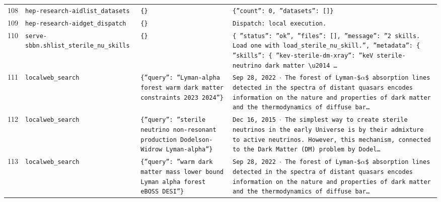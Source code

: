 \documentclass[11pt,a4paper]{article}
\begin{document}
\begin{longtable}{@{}p{}p{}p{}p{}@{}}
108 & \texttt{hep-research-aid}\newline\texttt{list\_\allowbreak{}datasets} & \texttt{\{\}\allowbreak{}} & \texttt{\{''count'':\allowbreak{} 0,\allowbreak{} ''datasets'':\allowbreak{} []\allowbreak{}\}\allowbreak{}} \\
109 & \texttt{hep-research-aid}\newline\texttt{get\_\allowbreak{}dispatch} & \texttt{\{\}\allowbreak{}} & \texttt{Dispatch:\allowbreak{} local execution.} \\
110 & \texttt{serve-sbbn.sh}\newline\texttt{list\_\allowbreak{}sterile\_\allowbreak{}nu\_\allowbreak{}skills} & \texttt{\{\}\allowbreak{}} & \texttt{\{   ''status'':\allowbreak{} ''ok'',\allowbreak{}   ''files'':\allowbreak{} []\allowbreak{},\allowbreak{}   ''message'':\allowbreak{} ''2 skills. Load one with load\_\allowbreak{}sterile\_\allowbreak{}nu\_\allowbreak{}skill.'',\allowbreak{}   ''metadata'':\allowbreak{} \{     ''skills'':\allowbreak{} \{       ''kev-sterile-dm-xray'':\allowbreak{} ''keV sterile-neutrino dark matter \textbackslash{}\allowbreak{}u2014 \ldots{}\allowbreak{}} \\
111 & \texttt{local}\newline\texttt{web\_\allowbreak{}search} & \texttt{\{''query'':\allowbreak{} ''Lyman-alpha forest warm dark matter constraints 2023 2024''\}\allowbreak{}} & \texttt{Sep 28,\allowbreak{} 2022 $\cdot$ The forest of Lyman-\$$\alpha$\$ absorption lines detected in the spectra of distant quasars encodes information on the nature and properties of dark matter and the thermodynamics of diffuse bar\ldots{}\allowbreak{}} \\
112 & \texttt{local}\newline\texttt{web\_\allowbreak{}search} & \texttt{\{''query'':\allowbreak{} ''sterile neutrino non-resonant production Dodelson-Widrow Lyman-alpha''\}\allowbreak{}} & \texttt{Dec 16,\allowbreak{} 2015 $\cdot$ The simplest way to create sterile neutrinos in the early Universe is by their admixture to active neutrinos. However,\allowbreak{} this mechanism,\allowbreak{} connected to the Dark Matter (DM)\allowbreak{} problem by Dodel\ldots{}\allowbreak{}} \\
113 & \texttt{local}\newline\texttt{web\_\allowbreak{}search} & \texttt{\{''query'':\allowbreak{} ''warm dark matter mass lower bound Lyman alpha forest eBOSS DESI''\}\allowbreak{}} & \texttt{Sep 28,\allowbreak{} 2022 $\cdot$ The forest of Lyman-\$$\alpha$\$ absorption lines detected in the spectra of distant quasars encodes information on the nature and properties of dark matter and the thermodynamics of diffuse bar\ldots{}\allowbreak{}} \\

\end{longtable}
\end{document}
